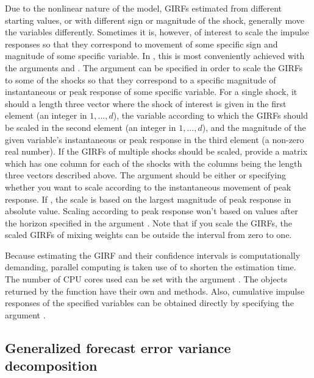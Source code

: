 \documentclass[nojss]{jss}
\begin{document}
Due to the nonlinear nature of the model, GIRFs estimated from different starting values, or with different sign or magnitude of the shock, generally move the variables differently. Sometimes it is, however, of interest to scale the impulse responses so that they correspond to movement of some specific sign and magnitude of some specific variable. In , this is most conveniently achieved with the arguments  and . The argument  can be specified in order to scale the GIRFs to some of the shocks so that they correspond to a specific magnitude of instantaneous or peak response of some specific variable. For a single shock, it should a length three vector where the shock of interest is given in the first element (an integer in $1,...,d$), the variable according to which the GIRFs should be scaled in the second element (an integer in $1,...,d$), and the magnitude of the given variable's instantaneous or peak response in the third element (a non-zero real number). If the GIRFs of multiple shocks should be scaled, provide a matrix which has one column for each of the shocks with the columns being the length three vectors described above. The argument  should be either  or  specifying whether you want to scale according to the instantaneous movement of peak response. If , the scale is based on the largest magnitude of peak response in absolute value. Scaling according to peak response won't based on values after the horizon specified in the argument . Note that if you scale the GIRFs, the scaled GIRFs of mixing weights can be outside the interval from zero to one.

Because estimating the GIRF and their confidence intervals is computationally demanding, parallel computing is taken use of to shorten the estimation time. The number of CPU cores used can be set with the argument . The objects returned by the  function have their own  and  methods. Also, cumulative impulse responses of the specified variables can be obtained directly by specifying the argument .

\subsection{Generalized forecast error variance decomposition}
\end{document}
